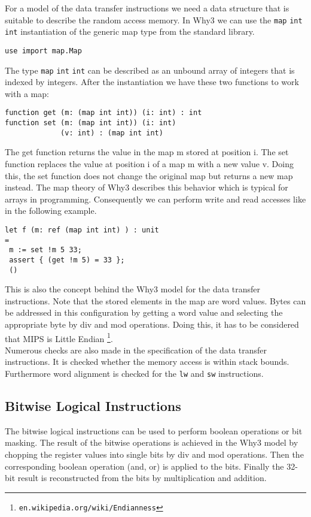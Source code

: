 For a model of the data transfer instructions we need a data structure that is suitable to describe the 
random access memory. In Why3 we can use the \verb"map" \verb"int" \verb"int" instantiation of the generic map type from the standard
library.
\begin{lstlisting}
use import map.Map
\end{lstlisting}
The type \verb"map" \verb"int" \verb"int" can be described as an unbound array of integers that is indexed by integers.
After the instantiation we have these two functions to work with a map:
\begin{lstlisting}
function get (m: (map int int)) (i: int) : int
function set (m: (map int int)) (i: int) 
             (v: int) : (map int int)
\end{lstlisting}
The get function returns the value in the map m stored at position i. The set function replaces the value
at position i of a map m with a new value v. Doing this, the set function does not change the original map but
returns a new map instead. The map theory of Why3 describes this behavior which is typical for arrays in 
programming. Consequently we can perform write and read accesses like in the following example.
\begin{lstlisting}
let f (m: ref (map int int) ) : unit
=
 m := set !m 5 33;
 assert { (get !m 5) = 33 };
 ()
\end{lstlisting}
This is also the concept behind the Why3 model for the data transfer instructions. Note that the stored elements
in the map are word values. Bytes can be addressed in this configuration by getting a word value and selecting
the appropriate byte by div and mod operations. Doing this, it has to be considered that MIPS is Little Endian \footnote{\verb"en.wikipedia.org/wiki/Endianness"}. \\
Numerous checks are also made in the specification of the data transfer instructions. It is checked whether the
memory access is within stack bounds. Furthermore word alignment is checked for the \verb"lw" and \verb"sw" instructions.  

\subsection{Bitwise Logical Instructions}

The bitwise logical instructions can be used to perform boolean operations or bit masking. The result of the 
bitwise operations is achieved in the Why3 model by chopping the register values into single bits by div and mod
operations. Then the corresponding boolean operation (and, or) is applied to the bits. Finally the 32-bit result
is reconstructed from the bits by multiplication and addition. 

